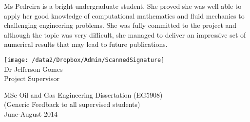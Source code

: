 \documentclass[14pt,twoside]{report}
\begin{document}
Ms Pedreira is a bright undergraduate student. She proved she was well able to apply her good knowledge of computational mathematics and fluid mechanics to challenging engineering problems. She was fully committed to the project and although the topic was very difficult, she managed to deliver an impressive set of numerical results that may lead to future publications. 
\vspace{2.cm}
\begin{center}
\texttt{[image: /data2/Dropbox/Admin/ScannedSignature]}\\
{Dr Jefferson Gomes}\\
{Project Supervisor}\\
\end{center}


\clearpage


\begin{center}
\Huge{MSc Oil and Gas Engineering Dissertation (EG5908)}\\
\huge{(Generic Feedback to all supervised students)}\\
\huge{June-August 2014}
\end{center}

\vfill

\clearpage

\end{document}
